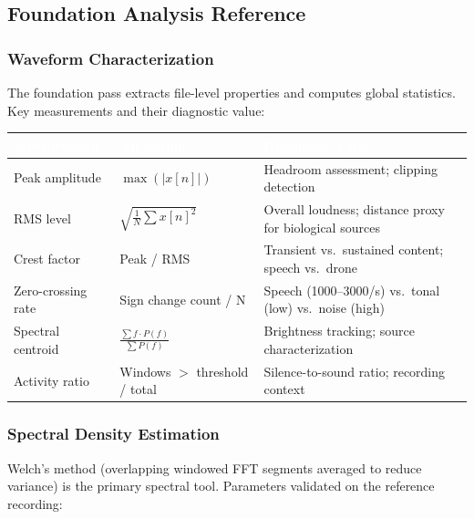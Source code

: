 \documentclass[11pt,letterpaper]{article}
\newcommand{\tableheader}[1]{\textbf{\sffamily\textcolor{white}{#1}}}
\begin{document}
\subsection{Foundation Analysis Reference}

\subsubsection{Waveform Characterization}

The foundation pass extracts file-level properties and computes global statistics. Key measurements and their diagnostic value:

\begin{center}
\begin{tabularx}{\textwidth}{L{3cm}L{3cm}X}
\toprule
{}
\tableheader{Measurement} & \tableheader{Algorithm} & \tableheader{Diagnostic Value} \\
\midrule
Peak amplitude & $\max(|x[n]|)$ & Headroom assessment; clipping detection \\
RMS level & $\sqrt{\frac{1}{N}\sum x[n]^2}$ & Overall loudness; distance proxy for biological sources \\
Crest factor & Peak / RMS & Transient vs.\ sustained content; speech vs.\ drone \\
Zero-crossing rate & Sign change count / N & Speech (1000--3000/s) vs.\ tonal (low) vs.\ noise (high) \\
Spectral centroid & $\frac{\sum f \cdot P(f)}{\sum P(f)}$ & Brightness tracking; source characterization \\
Activity ratio & Windows $>$ threshold / total & Silence-to-sound ratio; recording context \\
\bottomrule
\end{tabularx}
\end{center}

\subsubsection{Spectral Density Estimation}

Welch's method (overlapping windowed FFT segments averaged to reduce variance) is the primary spectral tool. Parameters validated on the reference recording:
\end{document}
